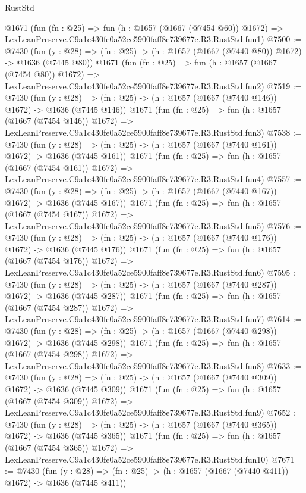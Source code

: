 \begin{lexlean}{RustStd}
\begin{coremodule}
    @1671
    (fun (fn : @25) =>
    fun (h : @1657 (@1667 (@7454 @60)) @1672) =>
    LexLeanPreserve.C9a1c430fe0a52ce5900faff8e739677e.R3.RustStd.fun1)
@7500 := @7430
    (fun (y : @28) => (fn : @25) -> (h : @1657 (@1667 (@7440 @80)) @1672) -> @1636 (@7445 @80))
    @1671
    (fun (fn : @25) =>
    fun (h : @1657 (@1667 (@7454 @80)) @1672) =>
    LexLeanPreserve.C9a1c430fe0a52ce5900faff8e739677e.R3.RustStd.fun2)
@7519 := @7430
    (fun (y : @28) => (fn : @25) -> (h : @1657 (@1667 (@7440 @146)) @1672) -> @1636 (@7445 @146))
    @1671
    (fun (fn : @25) =>
    fun (h : @1657 (@1667 (@7454 @146)) @1672) =>
    LexLeanPreserve.C9a1c430fe0a52ce5900faff8e739677e.R3.RustStd.fun3)
@7538 := @7430
    (fun (y : @28) => (fn : @25) -> (h : @1657 (@1667 (@7440 @161)) @1672) -> @1636 (@7445 @161))
    @1671
    (fun (fn : @25) =>
    fun (h : @1657 (@1667 (@7454 @161)) @1672) =>
    LexLeanPreserve.C9a1c430fe0a52ce5900faff8e739677e.R3.RustStd.fun4)
@7557 := @7430
    (fun (y : @28) => (fn : @25) -> (h : @1657 (@1667 (@7440 @167)) @1672) -> @1636 (@7445 @167))
    @1671
    (fun (fn : @25) =>
    fun (h : @1657 (@1667 (@7454 @167)) @1672) =>
    LexLeanPreserve.C9a1c430fe0a52ce5900faff8e739677e.R3.RustStd.fun5)
@7576 := @7430
    (fun (y : @28) => (fn : @25) -> (h : @1657 (@1667 (@7440 @176)) @1672) -> @1636 (@7445 @176))
    @1671
    (fun (fn : @25) =>
    fun (h : @1657 (@1667 (@7454 @176)) @1672) =>
    LexLeanPreserve.C9a1c430fe0a52ce5900faff8e739677e.R3.RustStd.fun6)
@7595 := @7430
    (fun (y : @28) => (fn : @25) -> (h : @1657 (@1667 (@7440 @287)) @1672) -> @1636 (@7445 @287))
    @1671
    (fun (fn : @25) =>
    fun (h : @1657 (@1667 (@7454 @287)) @1672) =>
    LexLeanPreserve.C9a1c430fe0a52ce5900faff8e739677e.R3.RustStd.fun7)
@7614 := @7430
    (fun (y : @28) => (fn : @25) -> (h : @1657 (@1667 (@7440 @298)) @1672) -> @1636 (@7445 @298))
    @1671
    (fun (fn : @25) =>
    fun (h : @1657 (@1667 (@7454 @298)) @1672) =>
    LexLeanPreserve.C9a1c430fe0a52ce5900faff8e739677e.R3.RustStd.fun8)
@7633 := @7430
    (fun (y : @28) => (fn : @25) -> (h : @1657 (@1667 (@7440 @309)) @1672) -> @1636 (@7445 @309))
    @1671
    (fun (fn : @25) =>
    fun (h : @1657 (@1667 (@7454 @309)) @1672) =>
    LexLeanPreserve.C9a1c430fe0a52ce5900faff8e739677e.R3.RustStd.fun9)
@7652 := @7430
    (fun (y : @28) => (fn : @25) -> (h : @1657 (@1667 (@7440 @365)) @1672) -> @1636 (@7445 @365))
    @1671
    (fun (fn : @25) =>
    fun (h : @1657 (@1667 (@7454 @365)) @1672) =>
    LexLeanPreserve.C9a1c430fe0a52ce5900faff8e739677e.R3.RustStd.fun10)
@7671 := @7430
    (fun (y : @28) => (fn : @25) -> (h : @1657 (@1667 (@7440 @411)) @1672) -> @1636 (@7445 @411))

\end{coremodule}
\end{lexlean}

